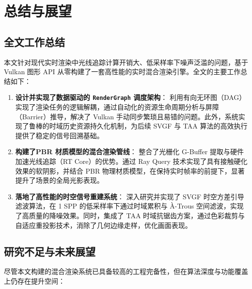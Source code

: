 
\chapter{总结与展望}
\label{chap:conclusion}

\section{全文工作总结}

本文针对现代实时渲染中光线追踪计算开销大、低采样率下噪声泛滥的问题，基于 Vulkan 图形 API 从零构建了一套高性能的实时混合渲染引擎。全文的主要工作总结如下：

\begin{enumerate}
    \item \textbf{设计并实现了数据驱动的 \texttt{RenderGraph} 调度架构}：
    利用有向无环图（DAG）实现了渲染任务的逻辑解耦，通过自动化的资源生命周期分析与屏障（Barrier）推导，解决了 Vulkan 手动同步繁琐且易错的问题。此外，系统实现了鲁棒的时域历史资源持久化机制，为后续 SVGF 与 TAA 算法的高效执行提供了稳定的信号回溯基础。
    
    \item \textbf{构建了PBR 材质模型的混合渲染管线}：
    整合了光栅化 G-Buffer 提取与硬件加速光线追踪（RT Core）的优势。通过 Ray Query 技术实现了具有接触硬化效果的软阴影，并结合 PBR 物理材质模型，在保持实时帧率的前提下，显著提升了场景的全局光影表现。
    
    \item \textbf{落地了高性能的时空信号重建系统}：
    深入研究并实现了 SVGF 时空方差引导滤波算法，在 1 SPP 的低采样率下通过时域累积与 À-Trous 空间滤波，实现了高质量的降噪效果。同时，集成了 TAA 时域抗锯齿方案，通过色彩裁剪与自适应重投影技术，消除了几何边缘走样，优化画面表现。
\end{enumerate}

\section{研究不足与未来展望}

尽管本文构建的混合渲染系统已具备较高的工程完备性，但在算法深度与功能覆盖上仍存在提升空间：

